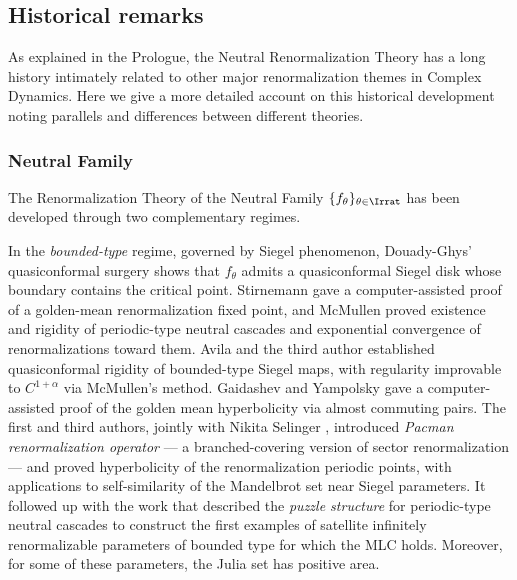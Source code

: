 \documentclass{amsart}
\begin{document}
\subsection{Historical remarks}
\label{ss:history}
As explained in the Prologue, 
the Neutral Renormalization Theory has a long history 
intimately related to other major renormalization themes in Complex Dynamics. 
Here we give a more detailed account on this historical development %
noting parallels and differences between different theories.



\subsubsection{Neutral Family}
\label{sss:Neutral:types}

The Renormalization Theory of the Neutral Family $\{f_\theta\}_{\theta \in \Irrat}$ 
has been developed through two complementary regimes.

In the \emph{bounded-type} regime, governed by Siegel phenomenon, Douady-Ghys' quasiconformal surgery \cite{D87,G84} shows that $f_\theta$ admits a quasiconformal Siegel disk whose boundary contains the critical point.
Stirnemann \cite{St94} gave a computer-assisted proof of a golden-mean renormalization fixed point, and McMullen \cite{McM98} proved existence and rigidity of periodic-type neutral cascades and exponential convergence of renormalizations toward them.
Avila and the third author \cite[\S4]{AL22} established quasiconformal rigidity of bounded-type Siegel maps, with regularity improvable to $C^{1+\alpha}$ via McMullen's method.
Gaidashev and Yampolsky \cite{GY22} gave a computer-assisted proof 
of the golden mean hyperbolicity via almost commuting pairs.
The first and third authors, jointly with Nikita Selinger \cite{DLS},
introduced \emph{Pacman renormalization operator} --- a branched-covering version of sector renormalization --- and proved hyperbolicity of the renormalization periodic points, with applications to self-similarity of the Mandelbrot set near Siegel parameters.
It followed up with  the work  \cite{DLy23} that described  the {\em puzzle structure} 
for periodic-type neutral cascades to construct the first examples  of satellite infinitely renormalizable parameters
of bounded type for which the  MLC holds.
Moreover, for some of these parameters, the Julia set has positive area. 
\end{document}
